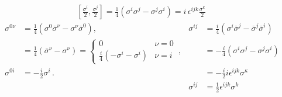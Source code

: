 \begin{align*}
  \left[\frac{\sigma^i}{2},\frac{\sigma^j}{2} \right]
 = \frac{1}{4}\left( \sigma^{i} \sigma^{j}-\sigma^{j} \sigma^{i}  \right)
=  i\,\epsilon^{ijk}\frac{\sigma^k}{2}
\
\end{align*}
\begin{align}
  \label{eq:sigijsi}
\sigma^{0\nu} &=\frac{1}{4}\left(\sigma^{0} \overline{\sigma}^{\nu}-\sigma^{\nu} \overline{\sigma}^{0}\right),                                         &\sigma^{ij} &=\frac{i}{4}\left(\sigma^{i} \overline{\sigma}^{j}-\overline{\sigma}^{j} \overline{\sigma}^{i}\right) \nonumber\\
              &=\frac{1}{4}\left(\overline{\sigma}^{\nu}-\sigma^{\nu}\right)=\begin{cases}0 & \nu=0\\\frac{i}{4}(-\sigma^i-\sigma^i) & \nu=i\end{cases}\,,&&=-\frac{i}{4}\left(\sigma^{i} \sigma^{j}-\sigma^{j} \sigma^{i}\right) \nonumber\\
      \sigma^{0i}  &=-\frac{i}{2} \sigma^{i}\,.                                                                                                            &&=-\frac{i}{2} i \epsilon^{i j k} \sigma^{\kappa}\\                                                                 
              &                                                                                                                                  &\sigma^{ij}&=\frac{1}{2} \epsilon^{i j k} \sigma^{k}                                          
\end{align}

